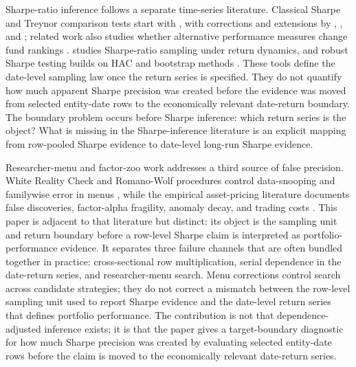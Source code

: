 \documentclass[12pt,a4paper]{article}
\begin{document}
Sharpe-ratio inference follows a separate time-series literature.
Classical Sharpe and Treynor comparison tests start with
\citet{jobson1981performance}, with corrections and extensions by
\citet{memmel2003performance}, \citet{opdyke2007comparing}, and
\citet{ledoit2008robust}; related work also studies whether alternative
performance measures change fund rankings \citep{eling2007does}.
\citet{lo2002statistics} studies Sharpe-ratio sampling under return
dynamics, and robust Sharpe testing builds on HAC and bootstrap methods
\citep{andrews1991heteroskedasticity,kiefer2005new,kunsch1989jackknife,politis1994stationary,lahiri2003resampling}.
These tools define the date-level sampling law once the return series is
specified.  They do not quantify how much apparent Sharpe precision was
created before the evidence was moved from selected entity-date rows to
the economically relevant date-return boundary.  The boundary problem
occurs before Sharpe inference: which return series is the object?
What is missing in the Sharpe-inference literature is an explicit mapping
from row-pooled Sharpe evidence to date-level long-run Sharpe evidence.

Researcher-menu and factor-zoo work addresses a third source of false
precision.  White Reality Check and Romano-Wolf procedures control
data-snooping and familywise error in menus
\citep{white2000reality,romano2005stepwise}, while the empirical
asset-pricing literature documents false discoveries, factor-alpha
fragility, anomaly decay, and trading costs
\citep{harvey2016and,harvey2020false,harvey2020census,bailey2014deflated,holm1979simple,fama1993common,carhart1997persistence,fama2010luck,mclean2016does,almgren2001optimal,hasbrouck2009trading,frazzini2015trading}.
This paper is adjacent to that literature but distinct: its object is
the sampling unit and return boundary before a row-level Sharpe claim is
interpreted as portfolio-performance evidence.  It separates three
failure channels that are often bundled together in practice:
cross-sectional row multiplication, serial dependence in the date-return
series, and researcher-menu search.
Menu corrections control search across candidate strategies; they do not
correct a mismatch between the row-level sampling unit used to report
Sharpe evidence and the date-level return series that defines portfolio
performance.
The contribution is not that dependence-adjusted inference exists; it is
that the paper gives a target-boundary diagnostic for how much Sharpe
precision was created by evaluating selected entity-date rows before the
claim is moved to the economically relevant date-return series.
\end{document}
